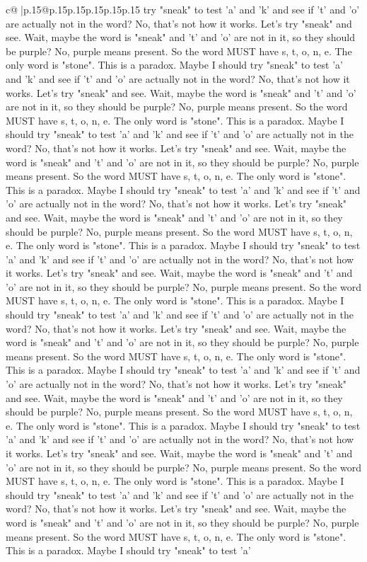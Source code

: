 \documentclass{article}
\begin{document}
{\begin{supertabular}{c@{$\;$}|p{.15\linewidth}@{}p{.15\linewidth}p{.15\linewidth}p{.15\linewidth}p{.15\linewidth}p{.15\linewidth}}
{{{try "sneak" to test 'a' and 'k' and see if 't' and 'o' are actually not in the word? No, that's not how it works. Let's try "sneak" and see. Wait, maybe the word is "sneak" and 't' and 'o' are not in it, so they should be purple? No, purple means present. So the word MUST have s, t, o, n, e. The only word is "stone". This is a paradox. Maybe I should try "sneak" to test 'a' and 'k' and see if 't' and 'o' are actually not in the word? No, that's not how it works. Let's try "sneak" and see. Wait, maybe the word is "sneak" and 't' and 'o' are not in it, so they should be purple? No, purple means present. So the word MUST have s, t, o, n, e. The only word is "stone". This is a paradox. Maybe I should try "sneak" to test 'a' and 'k' and see if 't' and 'o' are actually not in the word? No, that's not how it works. Let's try "sneak" and see. Wait, maybe the word is "sneak" and 't' and 'o' are not in it, so they should be purple? No, purple means present. So the word MUST have s, t, o, n, e. The only word is "stone". This is a paradox. Maybe I should try "sneak" to test 'a' and 'k' and see if 't' and 'o' are actually not in the word? No, that's not how it works. Let's try "sneak" and see. Wait, maybe the word is "sneak" and 't' and 'o' are not in it, so they should be purple? No, purple means present. So the word MUST have s, t, o, n, e. The only word is "stone". This is a paradox. Maybe I should try "sneak" to test 'a' and 'k' and see if 't' and 'o' are actually not in the word? No, that's not how it works. Let's try "sneak" and see. Wait, maybe the word is "sneak" and 't' and 'o' are not in it, so they should be purple? No, purple means present. So the word MUST have s, t, o, n, e. The only word is "stone". This is a paradox. Maybe I should try "sneak" to test 'a' and 'k' and see if 't' and 'o' are actually not in the word? No, that's not how it works. Let's try "sneak" and see. Wait, maybe the word is "sneak" and 't' and 'o' are not in it, so they should be purple? No, purple means present. So the word MUST have s, t, o, n, e. The only word is "stone". This is a paradox. Maybe I should try "sneak" to test 'a' and 'k' and see if 't' and 'o' are actually not in the word? No, that's not how it works. Let's try "sneak" and see. Wait, maybe the word is "sneak" and 't' and 'o' are not in it, so they should be purple? No, purple means present. So the word MUST have s, t, o, n, e. The only word is "stone". This is a paradox. Maybe I should try "sneak" to test 'a' and 'k' and see if 't' and 'o' are actually not in the word? No, that's not how it works. Let's try "sneak" and see. Wait, maybe the word is "sneak" and 't' and 'o' are not in it, so they should be purple? No, purple means present. So the word MUST have s, t, o, n, e. The only word is "stone". This is a paradox. Maybe I should try "sneak" to test 'a' and 'k' and see if 't' and 'o' are actually not in the word? No, that's not how it works. Let's try "sneak" and see. Wait, maybe the word is "sneak" and 't' and 'o' are not in it, so they should be purple? No, purple means present. So the word MUST have s, t, o, n, e. The only word is "stone". This is a paradox. Maybe I should try "sneak" to test 'a' }}}
\end{supertabular}}
\end{document}
